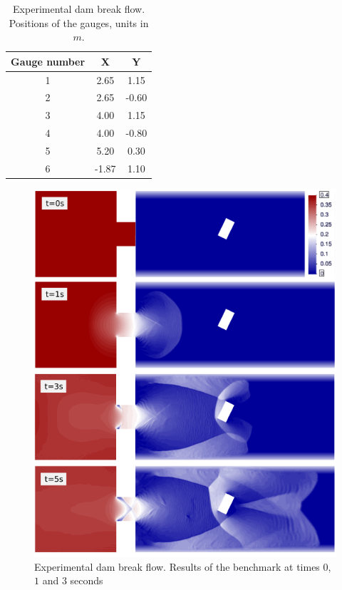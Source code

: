 \documentclass[a4paper,12pt]{elsarticle}
\begin{document}
\begin{table}
\centering
\begin{tabular}{ccc}
\hline
Gauge number & X & Y \\ \hline
1 &  2.65 &  1.15 \\
2 &  2.65 & -0.60 \\
3 &  4.00 &  1.15 \\
4 &  4.00 & -0.80 \\
5 &  5.20 &  0.30 \\
6 & -1.87 &  1.10 \\ \hline
\end{tabular}
\caption{Experimental dam break flow. Positions of the gauges, units in $m$.}
\label{gauges_positions}
\end{table}


\begin{figure}
\centering
\includegraphics[width=\textwidth]{img/exp/results.png}
\caption{Experimental dam break flow. Results of the benchmark at times $0$, $1$ and $3$ seconds}
\label{experiment_plots}
\end{figure}
\end{document}
